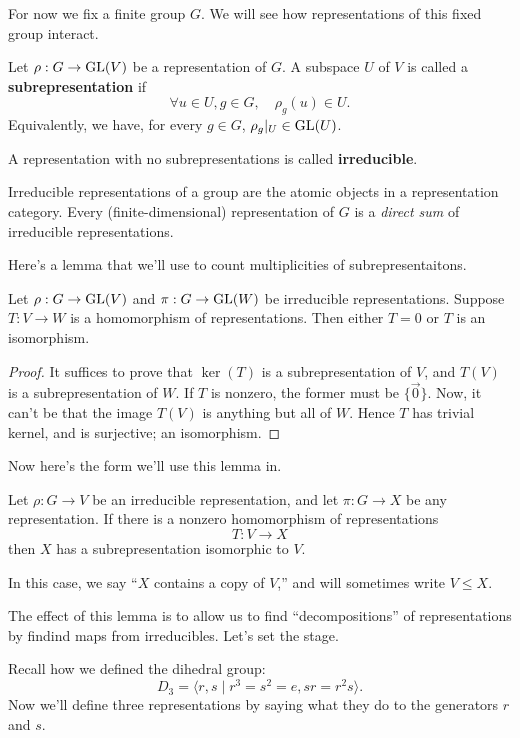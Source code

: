 For now we fix a finite group $G$.
We will see how representations of this fixed group interact.

\begin{definition}[Irreducibility]
    Let $\rho:G\to\operatorname{GL}(V)$ be a representation of $G$.
    A subspace $U$ of $V$ is called a {\bf subrepresentation} if 
    \[
        \forall u\in U, g\in G, \quad \rho_g(u)\in U.
    \]
    Equivalently, we have, for every $g\in G$, $\rho_g|_U \in \operatorname{GL}(U)$.

    A representation with no  subrepresentations is called {\bf irreducible}. 
\end{definition}

Irreducible representations of a group are the atomic objects in a representation category.
Every (finite-dimensional) representation of $G$ is a {\it direct sum} of irreducible representations.

Here's a lemma that we'll use to count multiplicities of subrepresentaitons.
\begin{lemma}
    Let $\rho:G\to\operatorname{GL}(V)$ and $\pi:G\to\operatorname{GL}(W)$ be irreducible representations.
    Suppose $T:V\to W$ is a homomorphism of representations.
    Then either $T=0$ or $T$ is an isomorphism.
\end{lemma}

\begin{proof}
    It suffices to prove that $\ker(T)$ is a subrepresentation of $V$, 
    and $T(V)$ is a subrepresentation of $W$.
    If $T$ is nonzero, the former must be $\{\vec{0}\}$.
    Now, it can't be that the image $T(V)$ is anything but all of $W$.
    Hence $T$ has trivial kernel, and is surjective; an isomorphism.
\end{proof}

Now here's the form we'll use this lemma in.
\begin{corollary}
    Let $\rho:G\to V$ be an irreducible representation, and let $\pi:G\to X$ be any representation.
    If there is a nonzero homomorphism of representations
    \[
        T:V\to X
    \]
    then $X$ has a subrepresentation isomorphic to $V$.
\end{corollary}

In this case, we say ``$X$ contains a copy of $V$,''
and will sometimes write $V\leq X$.

The effect of this lemma is to allow us to find ``decompositions'' of representations by findind maps from irreducibles.
Let's set the stage.

Recall how we defined the dihedral group: 
\[
    D_3 = \langle r,s \mid r^3=s^2=e, sr=r^2s \rangle.
\]
Now we'll define three representations by saying what they do to the generators $r$ and $s$.

